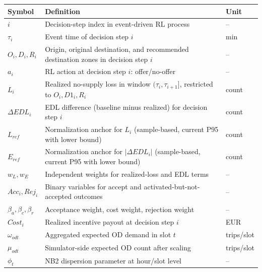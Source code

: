 \begin{longtable}{p{2.5cm}p{8cm}p{2.5cm}}
    \toprule
    Symbol & Definition & Unit \\
    \midrule\endhead
    \(i\) & Decision-step index in event-driven RL process & -- \\
    \(\tau_i\) & Event time of decision step \(i\) & min \\
    \(O_i,D_i,R_i\) & Origin, original destination, and recommended destination zones in decision step \(i\) & -- \\
    \(a_i\) & RL action at decision step \(i\): offer/no-offer & -- \\
    \(L_i\) & Realized no-supply loss in window \((\tau_i,\tau_{i+1}]\), restricted to \(O_i,D1_i,R_i\) & count \\
    \(\Delta EDL_i\) & EDL difference (baseline minus realized) for decision step \(i\) & count \\
    \(L_{ref}\) & Normalization anchor for \(L_i\) (sample-based, current P95 with lower bound) & count \\
    \(E_{ref}\) & Normalization anchor for \(|\Delta EDL_i|\) (sample-based, current P95 with lower bound) & count \\
    \(w_L,w_E\) & Independent weights for realized-loss and EDL terms & -- \\
    \(Acc_i, Rej_i\) & Binary variables for accept and activated-but-not-accepted outcomes & -- \\
    \(\beta_a,\beta_c,\beta_r\) & Acceptance weight, cost weight, rejection weight & -- \\
    \(Cost_i\) & Realized incentive payout at decision step \(i\) & EUR \\
    \(\omega_{odt}\) & Aggregated expected OD demand in slot \(t\) & trips/slot \\
    \(\mu_{odt}\) & Simulator-side expected OD count after scaling & trips/slot \\
    \(\phi_t\) & NB2 dispersion parameter at hour/slot level & -- \\
    \bottomrule
\end{longtable}
